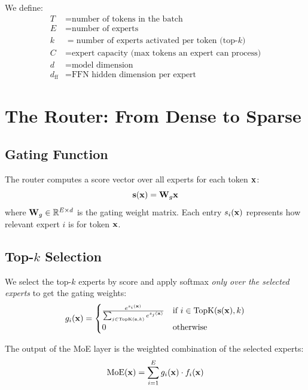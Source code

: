 We define:
\begin{align}
  T &= \text{number of tokens in the batch} \\
  E &= \text{number of experts} \\
  k &= \text{number of experts activated per token (top-}k\text{)} \\
  C &= \text{expert capacity (max tokens an expert can process)} \\
  d &= \text{model dimension} \\
  d_{\text{ff}} &= \text{FFN hidden dimension per expert}
\end{align}

\section{The Router: From Dense to Sparse}
\label{ch:13:sec:router}

\subsection{Gating Function}

The router computes a score vector over all experts for each token $\mathbf{x}$:
\begin{equation}
\mathbf{s}(\mathbf{x}) = \mathbf{W}_g \mathbf{x}
\end{equation}
where $\mathbf{W}_g \in \mathbb{R}^{E \times d}$ is the gating weight matrix. Each entry $s_i(\mathbf{x})$ represents how relevant expert $i$ is for token $\mathbf{x}$.

\subsection{Top-$k$ Selection}

We select the top-$k$ experts by score and apply softmax \emph{only over the selected experts} to get the gating weights:
\begin{equation}
\label{eq:13:topk}
g_i(\mathbf{x}) = \begin{cases}
  \frac{e^{s_i(\mathbf{x})}}{\sum_{j \in \text{TopK}(\mathbf{s}, k)} e^{s_j(\mathbf{x})}} & \text{if } i \in \text{TopK}(\mathbf{s}(\mathbf{x}), k) \\
  0 & \text{otherwise}
\end{cases}
\end{equation}

The output of the MoE layer is the weighted combination of the selected experts:
\begin{equation}
\label{eq:13:moe_output}
\text{MoE}(\mathbf{x}) = \sum_{i=1}^{E} g_i(\mathbf{x}) \cdot f_i(\mathbf{x})
\end{equation}

